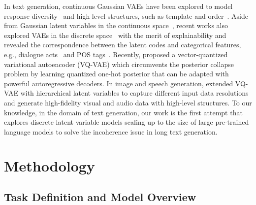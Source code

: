 \documentclass[11pt]{article}
\begin{document}
In text generation, continuous Gaussian VAEs have been explored to model response diversity~\citep{DBLP:conf/acl/ZhaoZE17,DBLP:conf/aaai/SerbanSLCPCB17} and high-level structures, such as template and order~\citep{DBLP:conf/emnlp/WisemanSR18,DBLP:conf/acl/ShenCZCWGC19,DBLP:conf/emnlp/ShaoHWXZ19}.
Aside from Gaussian latent variables in the continuous space~\citep{DBLP:journals/corr/KingmaW13}, recent works also explored VAEs in the discrete space~\citep{DBLP:conf/iclr/Rolfe17} with the merit of explainability and revealed the correspondence between the latent codes and categorical features, e.g., dialogue acts~\citep{DBLP:conf/acl/EskenaziLZ18} and POS tags~\citep{DBLP:journals/corr/abs-2103-11405}.
Recently, \citet{DBLP:conf/nips/OordVK17} proposed a vector-quantized variational autoencoder (VQ-VAE) which circumvents the posterior collapse problem by learning quantized one-hot posterior that can be adapted with powerful autoregressive decoders. 
In image and speech generation, \citet{vq-vae-2,DBLP:conf/nips/DielemanOS18} extended VQ-VAE with hierarchical latent variables to capture different input data resolutions and generate high-fidelity visual and audio data with high-level structures.
To our knowledge, in the domain of text generation, our work is the first attempt that explores discrete latent variable models scaling up to the size of large pre-trained language models to solve the incoherence issue in long text generation. 



\section{Methodology}



\subsection{Task Definition and Model Overview}
\end{document}
